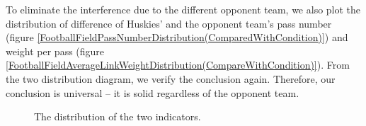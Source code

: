 \documentclass[12pt]{article}
\begin{document}
To eliminate the interference due to the different opponent team, we also plot the distribution of difference of Huskies' and the opponent team's pass number (figure \ref{FootballFieldPassNumberDistribution(ComparedWithCondition)}) and weight per pass (figure \ref{FootballFieldAverageLinkWeightDistribution(CompareWithCondition)}). From the two distribution diagram, we verify the conclusion again. Therefore, our conclusion is universal -- it is solid regardless of the opponent team.
\begin{figure}[h]
	\centering
	\caption{The distribution of the two indicators.}
\end{figure}
\end{document}
